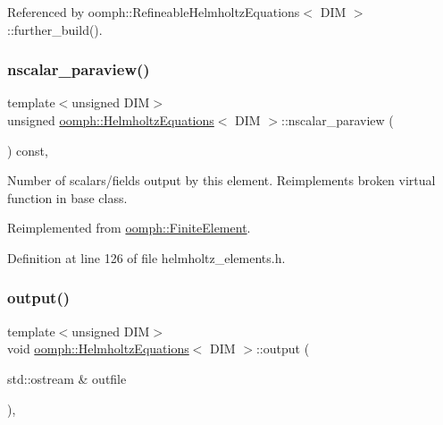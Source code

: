 Referenced by oomph\+::\+Refineable\+Helmholtz\+Equations$<$ D\+I\+M $>$\+::further\+\_\+build().

\mbox{\label{classoomph_1_1HelmholtzEquations_a339ef87468c1f5094b9f56e99c3bb212}} 
\subsubsection{\texorpdfstring{nscalar\+\_\+paraview()}{nscalar\_paraview()}}
{\footnotesize\ttfamily template$<$unsigned D\+IM$>$ \\
unsigned \hyperlink{classoomph_1_1HelmholtzEquations}{oomph\+::\+Helmholtz\+Equations}$<$ D\+IM $>$\+::nscalar\+\_\+paraview (\begin{DoxyParamCaption}{ }\end{DoxyParamCaption}) const\hspace{0.3cm}{\ttfamily [inline]}, {\ttfamily [virtual]}}



Number of scalars/fields output by this element. Reimplements broken virtual function in base class. 



Reimplemented from \hyperlink{classoomph_1_1FiniteElement_a865e2e5586552ba80babdbe26a77fe8c}{oomph\+::\+Finite\+Element}.



Definition at line 126 of file helmholtz\+\_\+elements.\+h.

\mbox{\label{classoomph_1_1HelmholtzEquations_ad06140cef8a602246cf45f1b38d201e3}} 
\subsubsection{\texorpdfstring{output()}{output()}\hspace{0.1cm}{\footnotesize\ttfamily [1/4]}}
{\footnotesize\ttfamily template$<$unsigned D\+IM$>$ \\
void \hyperlink{classoomph_1_1HelmholtzEquations}{oomph\+::\+Helmholtz\+Equations}$<$ D\+IM $>$\+::output (\begin{DoxyParamCaption}\item[{std\+::ostream \&}]{outfile }\end{DoxyParamCaption})\hspace{0.3cm}{\ttfamily [inline]}, {\ttfamily [virtual]}}



